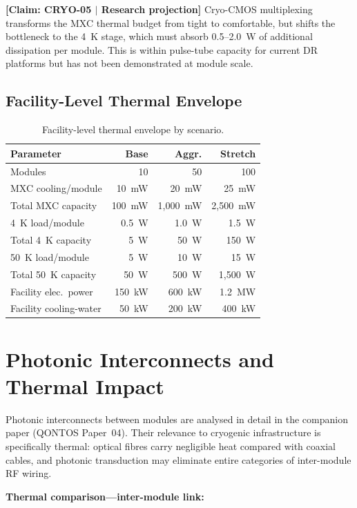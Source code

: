 \documentclass[conference]{IEEEtran}
\begin{document}
\textbf{[Claim: CRYO-05 $|$ Research projection]} Cryo-CMOS multiplexing transforms the MXC thermal budget from tight to comfortable, but shifts the bottleneck to the 4~K stage, which must absorb 0.5--2.0~W of additional dissipation per module. This is within pulse-tube capacity for current DR platforms but has not been demonstrated at module scale.

\subsection{Facility-Level Thermal Envelope}

\begin{table}[H]
\centering
\caption{Facility-level thermal envelope by scenario.}
\label{tab:facility-thermal}
\footnotesize
\begin{tabularx}{\columnwidth}{L{2.8cm}rrr}
\toprule
\textbf{Parameter} & \textbf{Base} & \textbf{Aggr.} & \textbf{Stretch} \\
\midrule
Modules & 10 & 50 & 100 \\
MXC cooling/module & 10~mW & 20~mW & 25~mW \\
Total MXC capacity & 100~mW & 1,000~mW & 2,500~mW \\
4~K load/module & 0.5~W & 1.0~W & 1.5~W \\
Total 4~K capacity & 5~W & 50~W & 150~W \\
50~K load/module & 5~W & 10~W & 15~W \\
Total 50~K capacity & 50~W & 500~W & 1,500~W \\
Facility elec.\ power & 150~kW & 600~kW & 1.2~MW \\
Facility cooling-water & 50~kW & 200~kW & 400~kW \\
\bottomrule
\end{tabularx}
\end{table}

\section{Photonic Interconnects and Thermal Impact}

Photonic interconnects between modules are analysed in detail in the companion paper (QONTOS Paper~04). Their relevance to cryogenic infrastructure is specifically thermal: optical fibres carry negligible heat compared with coaxial cables, and photonic transduction may eliminate entire categories of inter-module RF wiring.

\textbf{Thermal comparison---inter-module link:}
\end{document}

